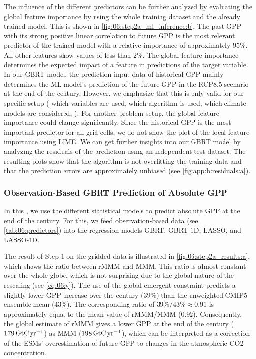 The influence of the different predictors can be further analyzed by evaluating
the global feature importance by using the whole training dataset and the
already trained model. This is shown in \cref{fig:06:step2a_ml_inference:b}.
The past \ac{GPP} with its strong positive linear correlation to future
\ac{GPP} is the most relevant predictor of the trained model with a relative
importance of approximately $95 \unit{\%}$. All other features show values of
less than $2 \unit{\%}$. The global feature importance determines the expected
impact of a feature in predictions of the target variable. In our \ac{GBRT}
model, the prediction input data of historical \ac{GPP} mainly determines the
\ac{ML} model's prediction of the future \ac{GPP} in the \acs{RCP}8.5 scenario
at the end of the  century. However, we emphasize that this is only
valid for our specific setup (\ie{} which variables are used, which algorithm
is used, which climate models are considered, \etc{}). For another problem
setup, the global feature importance could change significantly. Since the
historical \ac{GPP} is the most important predictor for all grid cells, we do
not show the plot of the local feature importance using \ac{LIME}. We can get
further insights into our \ac{GBRT} model by analyzing the residuals of the
prediction using an independent test dataset. The resulting plots show that the
algorithm is not overfitting the training data and that the prediction errors
are approximately unbiased (see \cref{fig:app:b:residuals:a}).


\subsubsection{Observation-Based \acs{GBRT} Prediction of Absolute \acs{GPP}}
\label{subsubsec:06:results_step2a_obs}

In this , we use the different
statistical models to predict absolute \ac{GPP} at the end of the 
century. For this, we feed observation-based data (see
\cref{tab:06:predictors}) into the regression models \ac{GBRT}, \acs{GBRT}-1D,
\ac{LASSO}, and \acs{LASSO}-1D.

The result of Step 1 on the gridded data is illustrated in
\cref{fig:06:step2a_results:a}, which shows the ratio between r\acs{MMM} and
\ac{MMM}. This ratio is almost constant over the whole globe, which is not
surprising due to the global nature of the rescaling (see \cref{eq:06:y}). The
use of the global emergent constraint predicts a slightly lower \ac{GPP}
increase over the  century ($39 \unit{\%}$) than the unweighted
\acs{CMIP}5 ensemble mean ($43 \unit{\%}$). The corresponding ratio of $39
\unit{\%} / 43 \unit{\%} \approx 0.91$ is approximately equal to the mean value
of r\acs{MMM}/\acs{MMM} ($0.92$). Consequently, the global estimate of
r\acs{MMM} gives a lower \ac{GPP} at the end of the century ($179
\unit{\GtCyr{}}$) as \ac{MMM} ($198 \unit{\GtCyr{}}$), which can be
interpreted as a correction of the \acp{ESM}' overestimation of future \ac{GPP}
to changes in the atmospheric \ac{CO2} concentration.

